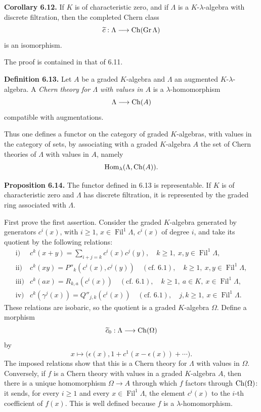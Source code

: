 \documentclass[11pt]{article}
\newcommand{\Gr}{\operatorname{Gr}}
\newcommand{\Fil}{\operatorname{Fil}}
\providecommand{\Gr}{\operatorname{Gr}}
\providecommand{\Gr}{\operatorname{G}}
\begin{document}
\textbf{Corollary 6.12.} If \(K\) is of characteristic zero, and if \(\Lambda\) is a \(K\)-\(\lambda\)-algebra with discrete filtration, then the completed Chern class
\[
  \widetilde c:\Lambda\longrightarrow \Ch(\Gr\Lambda)
\]
is an isomorphism.

The proof is contained in that of 6.11.

\textbf{Definition 6.13.} Let \(A\) be a graded \(K\)-algebra and \(\Lambda\) an augmented \(K\)-\(\lambda\)-algebra. A \emph{Chern theory for \(\Lambda\) with values in \(A\)} is a \(\lambda\)-homomorphism
\[
  \Lambda\longrightarrow \operatorname{Ch}(A)
\]
compatible with augmentations.

Thus one defines a functor on the category of graded \(K\)-algebras, with values in the category of sets, by associating with a graded \(K\)-algebra \(A\) the set of Chern theories of \(\Lambda\) with values in \(A\), namely
\[
  \operatorname{Hom}_\lambda(\Lambda,\operatorname{Ch}(A)).
\]

\textbf{Proposition 6.14.} The functor defined in 6.13 is representable. If \(K\) is of characteristic zero and \(\Lambda\) has discrete filtration, it is represented by the graded ring associated with \(\Lambda\).

First prove the first assertion. Consider the graded \(K\)-algebra generated by generators \(c^i(x)\), with \(i\ge1\), \(x\in\Fil^1\Lambda\), \(c^i(x)\) of degree \(i\), and take its quotient by the following relations:
\[
\begin{array}{ll}
\text{i)}&
 c^k(x+y)=\displaystyle\sum_{i+j=k}c^i(x)c^j(y),
 \quad k\ge1,\ x,y\in\Fil^1\Lambda,\\[0.8em]
\text{ii)}&
 c^k(xy)=P''_k(c^i(x),c^j(y))
 \quad(\text{cf. }6.1),
 \quad k\ge1,\ x,y\in\Fil^1\Lambda,\\[0.4em]
\text{iii)}&
 c^k(ax)=R_{k,a}(c^i(x))
 \quad(\text{cf. }6.1),
 \quad k\ge1,\ a\in K,\ x\in\Fil^1\Lambda,\\[0.4em]
\text{iv)}&
 c^k(\gamma^j(x))=Q''_{j,k}(c^i(x))
 \quad(\text{cf. }6.1),
 \quad j,k\ge1,\ x\in\Fil^1\Lambda.
\end{array}
\]
These relations are isobaric, so the quotient is a graded \(K\)-algebra \(\Omega\). Define a morphism
\[
  \widetilde c_0:\Lambda\longrightarrow \operatorname{Ch}(\Omega)
\]
by
\[
  x\longmapsto
  \bigl(\epsilon(x),1+c^1(x-\epsilon(x))+\cdots\bigr).
\]
The imposed relations show that this is a Chern theory for \(\Lambda\) with values in \(\Omega\). Conversely, if \(f\) is a Chern theory with values in a graded \(K\)-algebra \(A\), then there is a unique homomorphism \(\Omega\to A\) through which \(f\) factors through \(\operatorname{Ch}(\Omega)\): it sends, for every \(i\ge1\) and every \(x\in\Fil^1\Lambda\), the element \(c^i(x)\) to the \(i\)-th coefficient of \(f(x)\). This is well defined because \(f\) is a \(\lambda\)-homomorphism.
\end{document}
